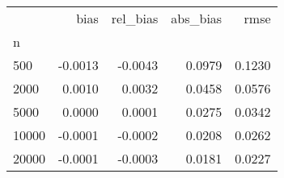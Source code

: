 \begin{tabular}{lrrrr}
\toprule
{} &    bias &  rel\_bias &  abs\_bias &   rmse \\
n     &         &           &           &        \\
\midrule
500   & -0.0013 &   -0.0043 &    0.0979 & 0.1230 \\
2000  &  0.0010 &    0.0032 &    0.0458 & 0.0576 \\
5000  &  0.0000 &    0.0001 &    0.0275 & 0.0342 \\
10000 & -0.0001 &   -0.0002 &    0.0208 & 0.0262 \\
20000 & -0.0001 &   -0.0003 &    0.0181 & 0.0227 \\
\bottomrule
\end{tabular}
